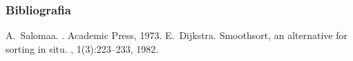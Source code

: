 \begin{frame}
    \frametitle{Bibliografia}
    \begin{thebibliography}{Dijkstra, 1982}
        A.~Salomaa.
        .
        \newblock Academic Press, 1973.
        E.~Dijkstra.
        \newblock Smoothsort, an alternative for sorting in situ.
        , 1(3):223--233, 1982.
    \end{thebibliography}
\end{frame}
